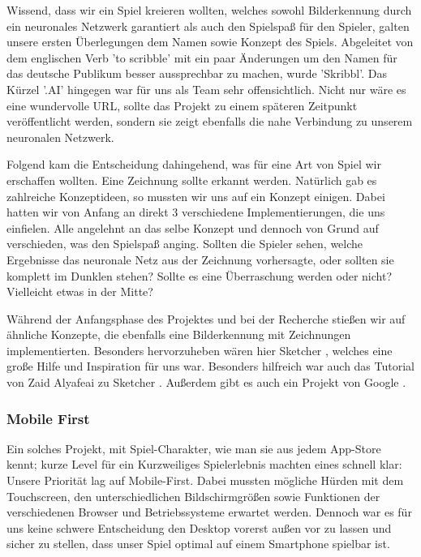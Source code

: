 \documentclass[11pt]{article}
\begin{document}
Wissend, dass wir ein Spiel kreieren wollten, welches sowohl Bilderkennung durch ein neuronales Netzwerk garantiert als auch den Spielspaß für den Spieler, galten unsere ersten Überlegungen dem Namen sowie Konzept des Spiels.
Abgeleitet von dem englischen Verb 'to scribble' mit ein paar Änderungen um den Namen für das deutsche Publikum besser aussprechbar zu machen, wurde 'Skribbl'. Das Kürzel '.AI' hingegen war für uns als Team sehr offensichtlich. Nicht nur wäre es eine wundervolle URL, sollte das Projekt zu einem späteren Zeitpunkt veröffentlicht werden, sondern sie zeigt ebenfalls die nahe Verbindung zu unserem neuronalen Netzwerk.

Folgend kam die Entscheidung dahingehend, was für eine Art von Spiel wir erschaffen wollten. Eine Zeichnung sollte erkannt werden. Natürlich gab es zahlreiche Konzeptideen, so mussten wir uns auf ein Konzept einigen. Dabei hatten wir von Anfang an direkt 3 verschiedene Implementierungen, die uns einfielen. Alle angelehnt an das selbe Konzept und dennoch von Grund auf verschieden, was den Spielspaß anging. Sollten die Spieler sehen, welche Ergebnisse das neuronale Netz aus der Zeichnung vorhersagte, oder sollten sie komplett im Dunklen stehen? Sollte es eine Überraschung werden oder nicht? Vielleicht etwas in der Mitte?

Während der Anfangsphase des Projektes und bei der Recherche stießen wir auf ähnliche Konzepte, die ebenfalls eine Bilderkennung mit Zeichnungen implementierten. Besonders hervorzuheben wären hier Sketcher \parencite{ZaidAlyafeai2018}, welches eine große Hilfe und Inspiration für uns war. Besonders hilfreich war auch das Tutorial von Zaid Alyafeai zu Sketcher \parencite{ZaidAlyafeaia2018Tutorial}. Außerdem gibt es auch ein Projekt von Google \parencite{GoogleQuickDraw2018}.

\subsubsection{Mobile First}

Ein solches Projekt, mit Spiel-Charakter, wie man sie aus jedem App-Store kennt; kurze Level für ein Kurzweiliges Spielerlebnis machten eines schnell klar: Unsere Priorität lag auf Mobile-First.
Dabei mussten mögliche Hürden mit dem Touchscreen, den unterschiedlichen Bildschirmgrößen sowie Funktionen der verschiedenen Browser und Betriebssysteme erwartet werden. Dennoch war es für uns keine schwere Entscheidung den Desktop vorerst außen vor zu lassen und sicher zu stellen, dass unser Spiel optimal auf einem Smartphone spielbar ist.
\end{document}
